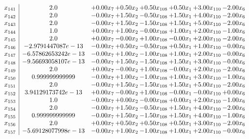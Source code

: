 \documentclass[8pt]{article}
\begin{document}
\[\begin{array}{c| c c@{\hskip 2pt} c@{\hskip 2pt} c@{\hskip 2pt} c@{\hskip 2pt} c@{\hskip 2pt} c@{\hskip 2pt} }
 x_{141}   &  2.0 & +  0.00 x_{7} & +  0.50 x_{2} & +  0.50 x_{108} & +  0.50 x_{1} & +  3.00 x_{110} & -2.00 x_{6}\\
 x_{142}   &  2.0 & -0.00 x_{7} & +  1.50 x_{2} & -0.50 x_{108} & +  1.50 x_{1} & +  4.00 x_{110} & -2.00 x_{6}\\
 x_{143}   &  2.0 & -0.00 x_{7} & +  1.50 x_{2} & -1.50 x_{108} & +  1.50 x_{1} & +  5.00 x_{110} & -2.00 x_{6}\\
 x_{144}   &  1.0 & +  0.00 x_{7} & +  1.00 x_{2} & -0.00 x_{108} & +  1.00 x_{1} & +  2.00 x_{110} & -1.00 x_{6}\\
 x_{145}   &  2.0 & +  0.00 x_{7} & -0.00 x_{2} & +  1.00 x_{108} & -0.00 x_{1} & +  2.00 x_{110} & -2.00 x_{6}\\
 x_{146}   &  -2.9791447087e-13 & -0.00 x_{7} & +  0.50 x_{2} & -0.50 x_{108} & +  0.50 x_{1} & +  1.00 x_{110} & -0.00 x_{6}\\
 x_{147}   &  -6.57862653242e-13 & -0.00 x_{7} & +  1.00 x_{2} & -1.00 x_{108} & +  1.00 x_{1} & +  2.00 x_{110} & -0.00 x_{6}\\
 x_{148}   &  -9.56693058107e-13 & -0.00 x_{7} & +  1.50 x_{2} & -1.50 x_{108} & +  1.50 x_{1} & +  3.00 x_{110} & -0.00 x_{6}\\
 x_{149}   &  2.0 & +  0.00 x_{7} & -0.00 x_{2} & +  1.00 x_{108} & -0.00 x_{1} & +  2.00 x_{110} & -2.00 x_{6}\\
 x_{150}   &  0.999999999999 & -0.00 x_{7} & +  1.00 x_{2} & -1.00 x_{108} & +  1.00 x_{1} & +  3.00 x_{110} & -1.00 x_{6}\\
 x_{151}   &  2.0 & -0.00 x_{7} & +  1.50 x_{2} & -1.50 x_{108} & +  1.50 x_{1} & +  5.00 x_{110} & -2.00 x_{6}\\
 x_{152}   &  3.94129173742e-13 & +  0.00 x_{7} & -0.00 x_{2} & +  1.00 x_{108} & -0.00 x_{1} & -0.00 x_{110} & +  0.00 x_{6}\\
 x_{153}   &  1.0 & -0.00 x_{7} & +  0.00 x_{2} & -0.00 x_{108} & +  0.00 x_{1} & +  2.00 x_{110} & -1.00 x_{6}\\
 x_{154}   &  2.0 & -0.00 x_{7} & +  1.50 x_{2} & -0.50 x_{108} & +  1.50 x_{1} & +  4.00 x_{110} & -2.00 x_{6}\\
 x_{155}   &  0.999999999999 & -0.00 x_{7} & +  1.50 x_{2} & -1.50 x_{108} & +  1.50 x_{1} & +  4.00 x_{110} & -1.00 x_{6}\\
 x_{156}   &  2.0 & +  0.00 x_{7} & +  0.50 x_{2} & +  0.50 x_{108} & +  0.50 x_{1} & +  3.00 x_{110} & -2.00 x_{6}\\
 x_{157}   &  -5.69128077998e-13 & -0.00 x_{7} & +  1.00 x_{2} & -1.00 x_{108} & +  1.00 x_{1} & +  2.00 x_{110} & -0.00 x_{6}\\

\end{array}\]
\end{document}
